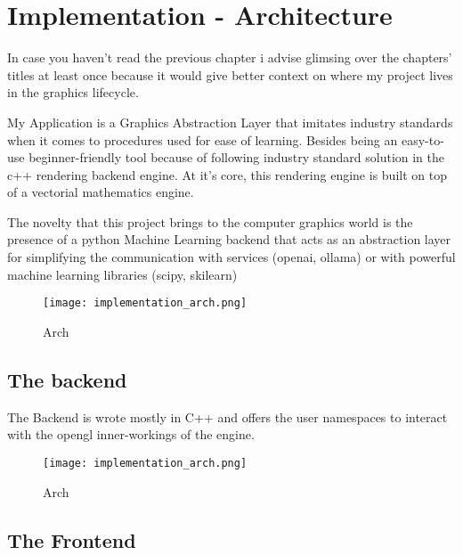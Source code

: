 


\chapter*{Implementation - Architecture}

  In case you haven't read the previous chapter i advise glimsing over the chapters' titles at least once because it would give better context on where my project lives in the graphics lifecycle.

  My Application is a Graphics Abstraction Layer that imitates industry standards when it comes to procedures used for ease of learning.
  Besides being an easy-to-use beginner-friendly tool because of following industry standard solution in the c++ rendering backend engine. At it's core, this rendering engine is built on top of a vectorial mathematics engine.

  The novelty that this project brings to the computer graphics world is the presence of a python Machine Learning backend that acts as an abstraction layer for simplifying the communication with services (openai, ollama) or with powerful machine learning libraries (scipy, skilearn) 
  
  \begin{figure}
    \begin{center}
      \texttt{[image: implementation\_arch.png]}
    \caption{Arch}
    \end{center}
  \end{figure}
  \pagebreak


  \section*{The backend}
    The Backend is wrote mostly in C++ and offers the user namespaces to interact with the opengl inner-workings of the engine.

    \begin{figure}
      \begin{center}
        \texttt{[image: implementation\_arch.png]}
      \caption{Arch}
      \end{center}
    \end{figure}
    \pagebreak

  \section*{The Frontend}

